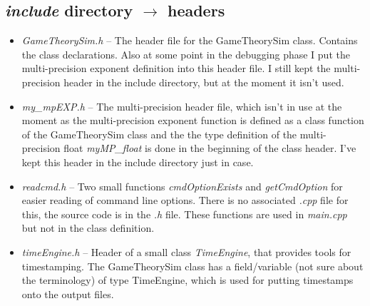 \documentclass{article}
\begin{document}
\subsection{\emph{include} directory $\rightarrow$ headers}
\begin{itemize}

\item \emph{GameTheorySim.h} -- The header file for the GameTheorySim class. Contains the class declarations. Also at some point in the debugging phase I put the multi-precision exponent definition into this header file. I still kept the multi-precision header in the include directory, but at the moment it isn't used. 

\item \emph{my\_mpEXP.h} -- The multi-precision header file, which isn't in use at the moment as the multi-precision exponent function is defined as a class function of the GameTheorySim class and the the type definition of the multi-precision float \emph{myMP\_float} is done in the beginning of the class header. I've kept this header in the include directory just in case.

\item \emph{readcmd.h} -- Two small functions \emph{cmdOptionExists} and \emph{getCmdOption} for easier reading of command line options. There is no associated \emph{.cpp} file for this, the source code is in the \emph{.h} file. These functions are used in \emph{main.cpp} but not in the class definition. 

\item \emph{timeEngine.h} -- Header of a small class \emph{TimeEngine}, that provides tools for timestamping. The GameTheorySim class has a field/variable (not sure about the terminology) of type TimeEngine, which is used for putting timestamps onto the output files.

\end{itemize}
\end{document}
